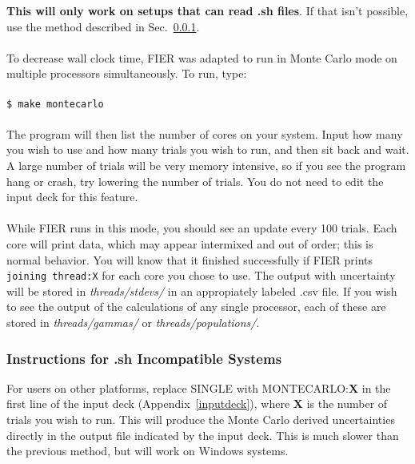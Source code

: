 \documentclass{article}
\begin{document}
\textbf{This will only work on setups that can read .sh files}. If that isn't possible, use the method described in Sec.~\ref{nobash}.
\\\\
To decrease wall clock time, FIER was adapted to run in Monte Carlo mode on multiple processors simultaneously. To run, type:
\\\\
\texttt{\$ make montecarlo}
\\\\
The program will then list the number of cores on your system. Input how many you wish to use and how many trials you wish to run, and then sit back and wait. A large number of trials will be very memory intensive, so if you see the program hang or crash, try lowering the number of trials. You do not need to edit the input deck for this feature. 
\\\\
While FIER runs in this mode, you should see an update every 100 trials. Each core will print data, which may appear intermixed and out of order; this is normal behavior. You will know that it finished successfully if FIER prints \texttt{joining thread:X} for each core you chose to use. The output with uncertainty will be stored in \textit{threads/stdevs/} in an appropiately labeled .csv file. If you wish to see the output of the calculations of any single processor, each of these are stored in \textit{threads/gammas/} or \textit{threads/populations/}.

\subsubsection{Instructions for .sh Incompatible Systems}
\label{nobash}
For users on other platforms, replace SINGLE with MONTECARLO:\textbf{X} in the first line of the input deck (Appendix~\ref{inputdeck}), where \textbf{X} is the number of trials you wish to run. This will produce the Monte Carlo derived uncertainties directly in the output file indicated by the input deck. This is much slower than the previous method, but will work on Windows systems.
\end{document}
